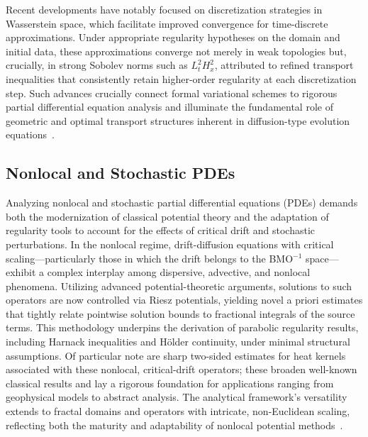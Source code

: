 \documentclass[sigconf]{acmart}
\begin{document}
Recent developments have notably focused on discretization strategies in Wasserstein space, which facilitate improved convergence for time-discrete approximations. Under appropriate regularity hypotheses on the domain and initial data, these approximations converge not merely in weak topologies but, crucially, in strong Sobolev norms such as $L^2_t H^2_x$, attributed to refined transport inequalities that consistently retain higher-order regularity at each discretization step. Such advances crucially connect formal variational schemes to rigorous partial differential equation analysis and illuminate the fundamental role of geometric and optimal transport structures inherent in diffusion-type evolution equations~\cite{ref96}.

\subsection{Nonlocal and Stochastic PDEs}

Analyzing nonlocal and stochastic partial differential equations (PDEs) demands both the modernization of classical potential theory and the adaptation of regularity tools to account for the effects of critical drift and stochastic perturbations. In the nonlocal regime, drift-diffusion equations with critical scaling—particularly those in which the drift belongs to the BMO$^{-1}$ space—exhibit a complex interplay among dispersive, advective, and nonlocal phenomena. Utilizing advanced potential-theoretic arguments, solutions to such operators are now controlled via Riesz potentials, yielding novel a priori estimates that tightly relate pointwise solution bounds to fractional integrals of the source terms. This methodology underpins the derivation of parabolic regularity results, including Harnack inequalities and Hölder continuity, under minimal structural assumptions. Of particular note are sharp two-sided estimates for heat kernels associated with these nonlocal, critical-drift operators; these broaden well-known classical results and lay a rigorous foundation for applications ranging from geophysical models to abstract analysis. The analytical framework's versatility extends to fractal domains and operators with intricate, non-Euclidean scaling, reflecting both the maturity and adaptability of nonlocal potential methods~\cite{ref95}.
\end{document}
